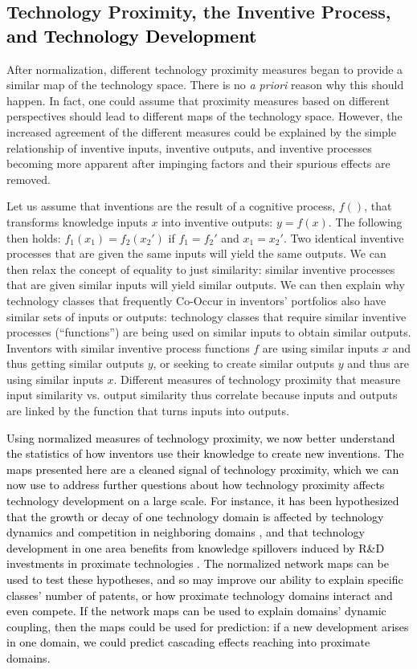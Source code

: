 \documentclass[]{svjour3}
\begin{document}
\subsection{Technology Proximity, the Inventive Process, \textcolor{black}{and Technology Development}}
After normalization, different technology proximity measures began to provide a similar map of the technology space. There is no \textit{a priori} reason why this should happen. In fact, one could assume that proximity measures based on different perspectives should lead to different maps of the technology space. However, the increased agreement of the different measures could be explained by the simple relationship of inventive inputs, inventive outputs, and inventive processes becoming more apparent after impinging factors and their spurious effects are removed.


Let us assume that inventions are the result of a cognitive process, $f()$, that transforms knowledge inputs $x$ into inventive outputs: $y=f(x)$. The following then holds: $f_1(x_1)=f_2(x_2′)$ if $f_1=f_2′$ and $x_1=x_2′$. Two identical inventive processes that are given the same inputs will yield the same outputs. We can then relax the concept of equality to just similarity: similar inventive processes that are given similar inputs will yield similar outputs. We can then explain why technology classes that frequently Co-Occur in inventors' portfolios also have similar sets of inputs or outputs: technology classes that require similar inventive processes (``functions'') are being used on similar inputs to obtain similar outputs. Inventors with similar inventive process functions $f$ are using similar inputs $x$ and thus getting similar outputs $y$, or seeking to create similar outputs $y$ and thus are using similar inputs $x$. Different measures of technology proximity that measure input similarity vs. output similarity thus correlate because inputs and outputs are linked by the function that turns inputs into outputs.

\textcolor{black}{Using normalized measures of technology proximity, we now better understand the statistics of how inventors use their knowledge to create new inventions. The maps presented here are a cleaned signal of technology proximity, which we can now use to address further questions about how technology proximity affects technology development on a large scale. For instance, it has been hypothesized that the growth or decay of one technology domain is affected by technology dynamics and competition in neighboring domains \citep{Saviotti1995,Bruckner1994}, and that technology development in one area benefits from knowledge spillovers induced by R\&D investments in proximate technologies \citep{Verspagen1997,Verspagen1997a,Bloom2013}. The normalized network maps can be used to test these hypotheses, and so may improve our ability to explain specific classes' number of patents, or how proximate technology domains interact and even compete. If the network maps can be used to explain domains' dynamic coupling, then the maps could be used for prediction: if a new development arises in one domain, we could predict cascading effects reaching into proximate domains.}
\end{document}
